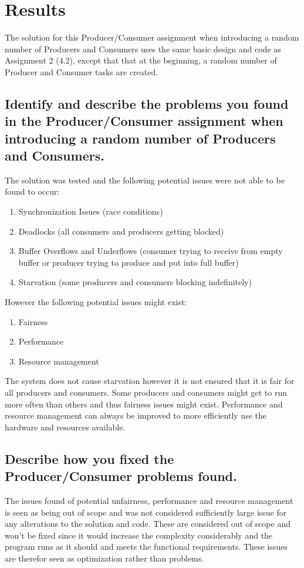 \section{Results}
\label{section:results}

The solution for this Producer/Consumer assignment when introducing a random number of Producers and Consumers uses the same basic design and code as Assignment 2 (4.2), except that that at the beginning, a random number of Producer and Consumer tasks are created.

\subsection{Identify and describe the problems you found in the Producer/Consumer assignment when introducing a random number of Producers and Consumers.}
The solution was tested and the following potential issues were not able to be found to occur:
\begin{enumerate}
    \item Synchronization Issues (race conditions)
    \item Deadlocks (all consumers and producers getting blocked)
    \item Buffer Overflows and Underflows (consumer trying to receive from empty buffer or producer trying to produce and put into full buffer)
    \item Starvation (some producers and consumers blocking indefinitely)
\end{enumerate}

However the following potential issues might exist:
\begin{enumerate}
    \item Fairness
    \item Performance
    \item Resource management
\end{enumerate}
The system does not cause starvation however it is not ensured that it is fair for all producers and consumers. Some producers and consumers might get to run more often than others and thus fairness issues might exist. Performance and resource management can always be improved to more efficiently use the hardware and resources available.

\subsection{Describe how you fixed the Producer/Consumer problems found.}
The issues found of potential unfairness, performance and resource management is seen as being out of scope and was not considered sufficiently large issue for any alterations to the solution and code. These are considered out of scope and won't be fixed since it would increase the complexity considerably and the program runs as it should and meets the functional requirements. These issues are therefor seen as optimization rather than problems.